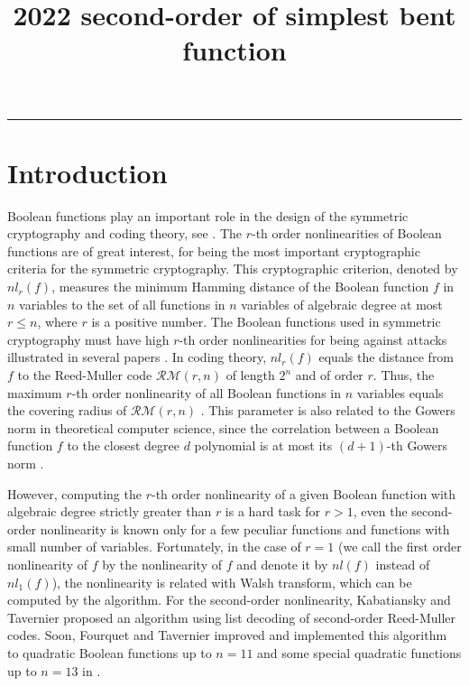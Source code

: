 \documentclass{article}
\title{ 2022 second-order of simplest \mathcal{PS} bent function}
\newcommand{\0}{\textbf{0}}
\newcommand{\1}{\textbf{1}}
\theoremstyle{plain}
\begin{document}
  \noindent
  \rule{\linewidth}{0.4pt}


\section{Introduction}
    Boolean functions play an important role in the design of the symmetric cryptography and coding theory, see \cite{Carlet2007book,BhattacharyyaKSSZ2010gowers,CohenHLL1997RMcodecover}. 
    The $ r $-th order nonlinearities of Boolean functions are of great interest, for being the most important cryptographic criteria for the symmetric cryptography. 
    This cryptographic criterion, denoted by $ nl_r(f) $, measures the minimum Hamming distance of the Boolean function $ f $ in $ n $ variables to the set of all functions in $ n $ variables of algebraic degree at most $ r\le n $, where $ r $ is a positive number. 
    The Boolean functions used in symmetric cryptography must have high $ r $-th order nonlinearities for being against attacks illustrated in several papers \cite{Golic1996lower_order_approximation,IwataK1999highorderbentfunction,KnudsenR1996nonlinear_approximation,Courtois2002XL_algorithm_and_NL_r}. 
    In coding theory, $ nl_r(f) $ equals the distance from $ f $ to the Reed-Muller code $ \mathcal{RM}(r,n) $ of length $ 2^n $ and of order $ r $. 
    Thus, the maximum $ r $-th order nonlinearity of all Boolean functions in $ n $ variables equals the covering radius of $ \mathcal{RM}(r,n) $ \cite{CohenHLL1997RMcodecover}. 
    This parameter is also related to the Gowers norm in theoretical computer science, since the correlation between a Boolean function $ f $ to the closest degree $ d $ polynomial is at most its $ (d+1) $-th Gowers norm \cite{BhattacharyyaKSSZ2010gowers}.

    However, computing the $ r $-th order nonlinearity of a given Boolean function with algebraic degree strictly greater than $ r $ is a hard task for $ r>1 $, even the second-order nonlinearity is known only for a few peculiar functions and functions with small number of variables. 
    Fortunately, in the case of $ r=1 $ (we call the first order nonlinearity of $ f $ by the nonlinearity of $ f $ and denote it by $ nl(f) $ instead of $ nl_1(f) $), the nonlinearity is related with Walsh transform, which can be computed by the algorithm. 
    For the second-order nonlinearity, Kabatiansky and Tavernier \cite{KabatianskyT2005listdecoding_RM_2_n} proposed an algorithm using list decoding of second-order Reed-Muller codes. 
    Soon, Fourquet and Tavernier improved and implemented this algorithm to quadratic Boolean functions up to $ n=11 $ and some special quadratic functions up to $ n=13 $ in \cite{FourquetT2008improved_listdecoding_RM_2_n}.
\end{document}
